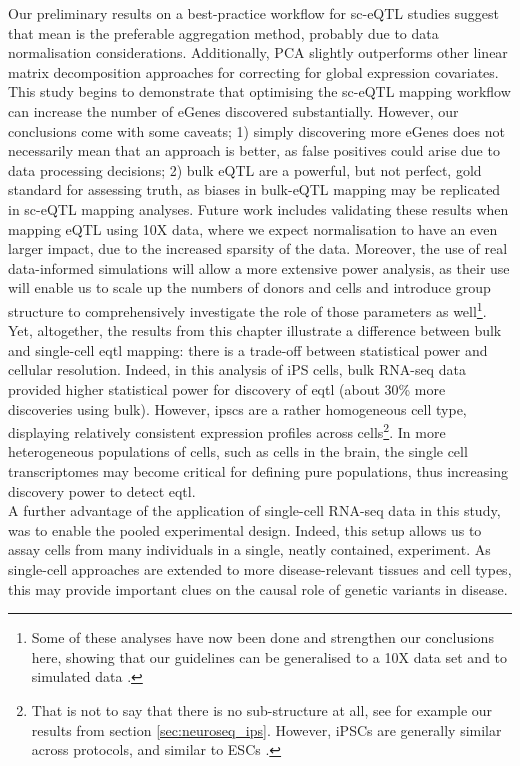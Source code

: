 Our preliminary results on a best-practice workflow for sc-eQTL studies suggest that mean is the preferable aggregation method, probably due to data normalisation considerations.
Additionally, PCA slightly outperforms other linear matrix decomposition approaches for correcting for global expression covariates.
This study begins to demonstrate that optimising the sc-eQTL mapping workflow can increase the number of eGenes discovered substantially. 
However, our conclusions come with some caveats; 1) simply discovering more eGenes does not necessarily mean that an approach is better, as false positives could arise due to data processing decisions; 2) bulk eQTL are a powerful, but not perfect, gold standard for assessing truth, as biases in bulk-eQTL mapping may be replicated in sc-eQTL mapping analyses.
Future work includes validating these results when mapping eQTL using 10X data, where we expect normalisation to have an even larger impact, due to the increased sparsity of the data.
Moreover, the use of real data-informed simulations will allow a more extensive power analysis, as their use will enable us to scale up the numbers of donors and cells and introduce group structure to comprehensively investigate the role of those parameters as well\footnote{Some of these analyses have now been done and strengthen our conclusions here, showing that our guidelines can be generalised to a 10X data set and to simulated data \cite{cuomo2021optimising}.}. \\

Yet, altogether, the results from this chapter illustrate a difference between bulk and single-cell \gls{eqtl} mapping: there is a trade-off between statistical power and cellular resolution. 
Indeed, in this analysis of iPS cells, bulk RNA-seq data provided higher statistical power for discovery of \gls{eqtl} (about 30\% more discoveries using bulk). 
However, \glspl{ipsc} are a rather homogeneous cell type, displaying relatively consistent expression profiles across cells\footnote{That is not to say that there is no sub-structure at all, see for example our results from section \ref{sec:neuroseq_ips}. 
However, iPSCs are generally similar across protocols, and similar to ESCs \cite{bonder2019systematic}.}.
In more heterogeneous populations of cells, such as cells in the brain, the single cell transcriptomes may become critical for defining pure populations, thus increasing discovery power to detect \gls{eqtl}.\\

A further advantage of the application of single-cell RNA-seq data in this study, was to enable the pooled experimental design. 
Indeed, this setup allows us to assay cells from many individuals in a single, neatly contained, experiment.
As single-cell approaches are extended to more disease-relevant tissues and cell types, this may provide important clues on the causal role of genetic variants in disease. \\

